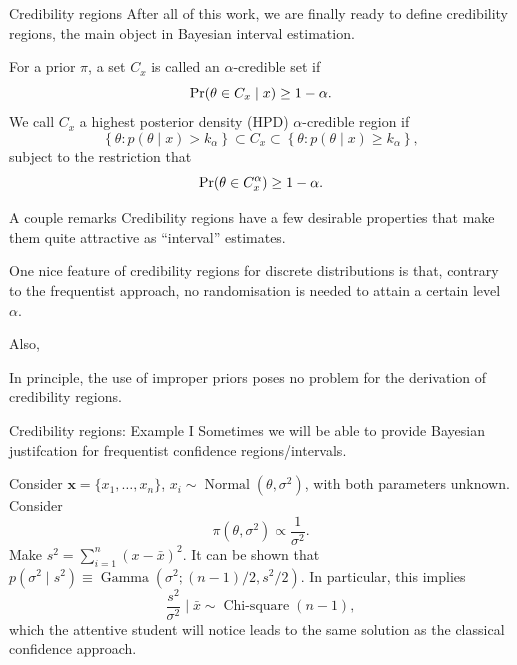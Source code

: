 \begin{frame}{Credibility regions}
After all of this work, we are finally ready to define credibility regions, the main object in Bayesian interval estimation.
\begin{defn}
For a prior $\pi$, a set $C_x$ is called an $\alpha$-credible set if 
\begin{equation*}
 \operatorname{Pr}(\theta \in C_x \mid x) \geq 1-\alpha.
\end{equation*}
We call $C_x$ a highest posterior density (HPD) $\alpha$-credible region if
\begin{equation*}
 \left\{\theta : p(\theta \mid x) > k_\alpha \right\} \subset C_x \subset \left\{\theta : p(\theta \mid x) \geq k_\alpha \right\},
\end{equation*}
subject to the restriction that
\begin{equation*}
 \operatorname{Pr}(\theta \in C_x^\alpha) \geq 1-\alpha.
\end{equation*}
\end{defn}
\end{frame}
\begin{frame}{A couple remarks}
Credibility regions have a few desirable properties that make them quite attractive as ``interval'' estimates.
\begin{remark}[No randomisation]
 One nice feature of credibility regions for discrete distributions is that, contrary to the frequentist approach, no randomisation is needed to attain a certain level $\alpha$.
\end{remark}
Also,
\begin{remark}
 In principle, the use of improper priors poses no problem for the derivation of credibility regions.
\end{remark} 
\end{frame}
\begin{frame}{Credibility regions: Example I}
Sometimes we will be able to provide Bayesian justifcation for frequentist confidence regions/intervals.
\begin{example}
\label{ex:cred_var_normal_Jeffreys}
Consider $\boldsymbol{x} = \{ x_1, \ldots, x_n \}$, $x_i \sim \operatorname{Normal}(\theta, \sigma^2)$, with both parameters unknown.
Consider
$$ \pi(\theta, \sigma^2) \propto \frac{1}{\sigma^2}. $$
Make $s^2 = \sum_{i=1}^n (x-\bar{x})^2$.
It can be shown that $p(\sigma^2 \mid  s^2) \equiv \operatorname{Gamma}(\sigma^2; (n-1)/2, s^2/2)$.
In particular, this implies
\begin{equation*}
 \frac{s^2}{\sigma^2} \mid \bar{x} \sim \operatorname{Chi-square}(n-1),
\end{equation*}
which the attentive student will notice leads to the same solution as the classical confidence approach.
\end{example}
\end{frame}
